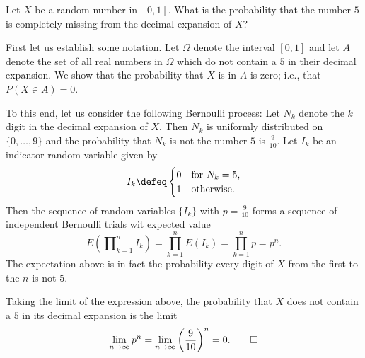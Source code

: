 \begin{problem}[Handout 18, \# 16]
  Let \(X\) be a random number in \([0,1]\). What is the probability that
  the number \(5\) is completely missing from the decimal expansion of
  \(X\)?
\end{problem}
\begin{solution}
  First let us establish some notation. Let \(\Omega\) denote the interval
  \([0,1]\) and let \(A\) denote the set of all real numbers in \(\Omega\)
  which do not contain a \(5\) in their decimal expansion. We show that the
  probability that \(X\) is in \(A\) is zero; i.e., that \(P(X\in A)=0\).

  To this end, let us consider the following Bernoulli process: Let \(N_k\)
  denote the \(k\) digit in the decimal expansion of
  \(X\). Then \(N_k\) is uniformly distributed on \(\{0,\dotsc,9\}\) and
  the probability that \(N_k\) is not the number \(5\) is
  \(\frac{9}{10}\). Let \(I_k\) be an indicator random variable given by
  \[
    I_k\defeq%
    \begin{cases}%
      0&\text{for \(N_k=5\),}\\
      1&\text{otherwise.}
    \end{cases}
  \]
  Then the sequence of random variables \(\{I_k\}\) with \(p=\frac{9}{10}\)
  forms a sequence of independent Bernoulli trials wit expected value
  \[
    E\left(\prod\nolimits_{k=1}^n I_k\right)=%
    \prod_{k=1}^n E(I_k)=%
    \prod_{k=1}^n p=p^n.
  \]
  The expectation above is in fact the probability every digit of \(X\)
  from the first to the \(n\) is not \(5\).

  Taking the limit of the expression above, the probability that \(X\) does
  not contain a \(5\) in its decimal expansion is the limit
  \[
    \lim_{n\to\infty}
    p^n=\lim_{n\to\infty}\left(\frac{9}{10}\right)^n=0.\qedhere
  \]
\end{solution}
\newpage

